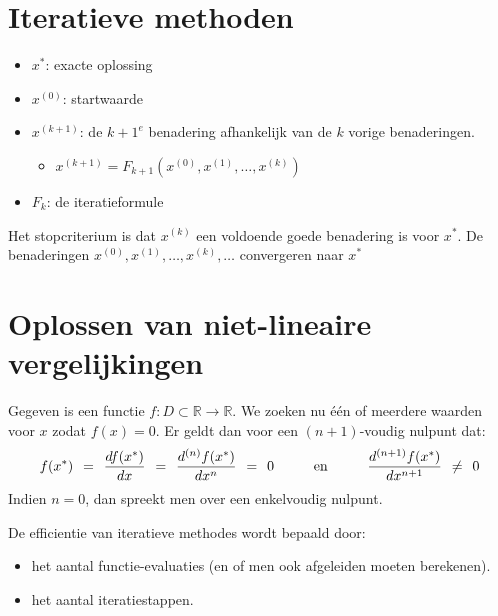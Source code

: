 \documentclass[11pt]{report}
\def \eq {\hspace{1.5mm}=\hspace{1.5mm}}
\def \noteq {\hspace{1.5mm}\neq\hspace{1.5mm}}
\def \H {\hspace{1cm}}
\def \R {\mathbb{R}}
\begin{document}
\chapter{Iteratieve methoden}
	\begin{itemize}
		\item $x^*$: \hspace{4.3mm} exacte oplossing
		\item $x^{(0)}$: \hspace{3.7mm}startwaarde
		\item $x^{(k+1)}$: de $k+1^e$ benadering afhankelijk van de $k$ vorige benaderingen.
		\begin{itemize}
			\item $x^{(k+1)} = F_{k+1}(x^{(0)}, x^{(1)}, \dots, x^{(k)})$
		\end{itemize}
		\item $F_k$: \hspace{6mm}de iteratieformule
	\end{itemize}
	Het stopcriterium is dat $x^{(k)}$ een voldoende goede benadering is voor $x^*$. De benaderingen $x^{(0)}, x^{(1)}, \dots, x^{(k)}, \dots$ convergeren naar $x^*$
	
\chapter{Oplossen van niet-lineaire vergelijkingen}
	Gegeven is een functie $f: D \subset \R \to \R$. We zoeken nu \'{e}\'{e}n of meerdere waarden voor $x$ zodat $f(x) = 0$. Er geldt dan voor een $(n+1)$-voudig nulpunt dat:
	$$f(x^*) \eq \frac{df(x^*)}{dx} \eq \frac{d^{(n)}f(x^*)}{dx^n} \eq 0 \H\text{en}\H \frac{d^{(n+1)}f(x^*)}{dx^{n+1}} \noteq 0$$
	Indien $n=0$, dan spreekt men over een enkelvoudig nulpunt.
	
	De efficientie van iteratieve methodes wordt bepaald door:
	\begin{itemize}
		\item het aantal functie-evaluaties (en of men ook afgeleiden moeten berekenen).
		\item het aantal iteratiestappen.
	\end{itemize}
	
\end{document}
